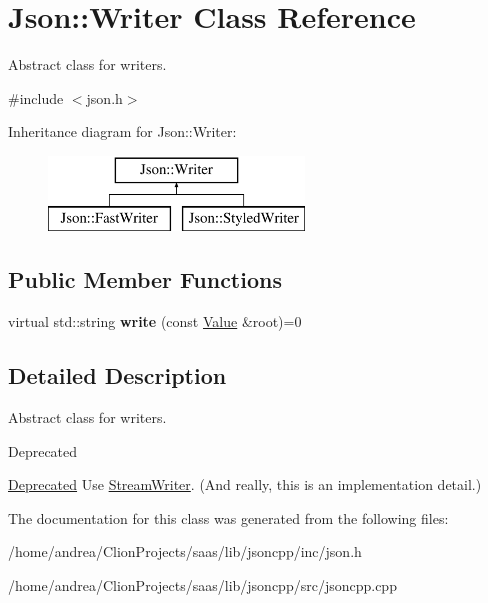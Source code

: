 \hypertarget{class_json_1_1_writer}{}\section{Json\+:\+:Writer Class Reference}
\label{class_json_1_1_writer}


Abstract class for writers.  




{\ttfamily \#include $<$json.\+h$>$}

Inheritance diagram for Json\+:\+:Writer\+:\begin{figure}[H]
\begin{center}
\leavevmode
\includegraphics[height=2.000000cm]{class_json_1_1_writer}
\end{center}
\end{figure}
\subsection*{Public Member Functions}
\begin{DoxyCompactItemize}
\item 
virtual std\+::string {\bfseries write} (const \hyperlink{class_json_1_1_value}{Value} \&root)=0\hypertarget{class_json_1_1_writer_a7b2273a4ffd6f32b369ac8a53b7b5a0d}{}\label{class_json_1_1_writer_a7b2273a4ffd6f32b369ac8a53b7b5a0d}

\end{DoxyCompactItemize}


\subsection{Detailed Description}
Abstract class for writers. 

\begin{DoxyRefDesc}{Deprecated}
\item[\hyperlink{deprecated__deprecated000007}{Deprecated}]Use \hyperlink{class_json_1_1_stream_writer}{Stream\+Writer}. (And really, this is an implementation detail.) \end{DoxyRefDesc}


The documentation for this class was generated from the following files\+:\begin{DoxyCompactItemize}
\item 
/home/andrea/\+Clion\+Projects/saas/lib/jsoncpp/inc/json.\+h\item 
/home/andrea/\+Clion\+Projects/saas/lib/jsoncpp/src/jsoncpp.\+cpp\end{DoxyCompactItemize}
